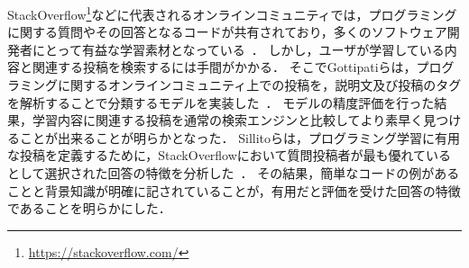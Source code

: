 StackOverflow\footnote{\url{https://stackoverflow.com/}}などに代表されるオンラインコミュニティでは，プログラミングに関する質問やその回答となるコードが共有されており，多くのソフトウェア開発者にとって有益な学習素材となっている~\cite{Mamykina_Design_SO}．
しかし，ユーザが学習している内容と関連する投稿を検索するには手間がかかる．
そこでGottipatiらは，プログラミングに関するオンラインコミュニティ上での投稿を，説明文及び投稿のタグを解析することで分類するモデルを実装した~\cite{Gottipati_finding_resource}．
モデルの精度評価を行った結果，学習内容に関連する投稿を通常の検索エンジンと比較してより素早く見つけることが出来ることが明らかとなった．
Sillitoらは，プログラミング学習に有用な投稿を定義するために，StackOverflowにおいて質問投稿者が最も優れているとして選択された回答の特徴を分析した~\cite{StackOverflowCodeExample}．
その結果，簡単なコードの例があることと背景知識が明確に記されていることが，有用だと評価を受けた回答の特徴であることを明らかにした．



%
%

